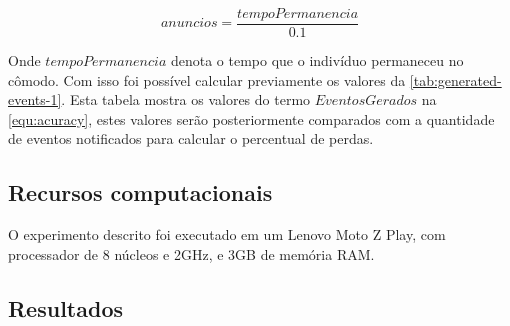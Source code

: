 \begin{equation}
	anuncios = \frac{tempoPermanencia}{0.1} 
\end{equation}


Onde $tempoPermanencia$ denota o tempo que o indivíduo permaneceu no cômodo.
Com isso foi possível calcular previamente os valores da \autoref{tab:generated-events-1}.  
Esta tabela mostra os valores do termo $EventosGerados$ na \autoref{equ:acuracy}, estes valores serão posteriormente comparados com a quantidade de eventos notificados para calcular o percentual de perdas.

\begin{table}[htb]
	\begin{center}
	\end{center}
\end{table}



\subsection{Recursos computacionais}

O experimento descrito foi executado em um \smartphone Lenovo Moto Z Play, com processador de 8 núcleos e 2GHz, e 3GB de memória RAM.

\subsection{Resultados}

\newcommand{\nullval}{\textbf{---}}

